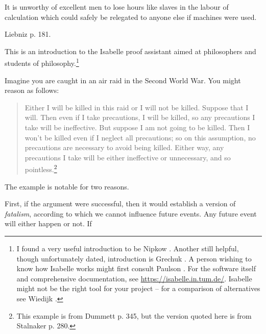 %
\begin{isabellebody}%
%
%
\isadelimtheory
%
\endisadelimtheory
%
\isatagtheory
%
\endisatagtheory
{\isafoldtheory}%
%
\isadelimtheory
%
\endisadelimtheory
%
\begin{isamarkuptext}%
\epigraph{It is unworthy of excellent men to lose hours like slaves in the labour of calculation which could 
safely be relegated to anyone else if machines were used.}{Liebniz \cite{smith_source_1959} p. 181.}%
\end{isamarkuptext}\isamarkuptrue%
%
\begin{isamarkuptext}%
This is an introduction to the Isabelle proof assistant aimed at philosophers and students
of philosophy.\footnote{I found a very useful introduction to be Nipkow \cite{nipkow_tutorial_2011}.
Another still helpful, though unfortunately dated, introduction is Grechuk \cite{grechuk_isabelle_2010}.
A person wishing to know how Isabelle works might first consult Paulson \cite{paulson_ml_1996}.
For the software itself and comprehensive documentation, see \url{https://isabelle.in.tum.de/}.
Isabelle might not be the right tool for your project -- for a comparison of alternatives see
Wiedijk \cite{wiedijk_seventeen_2006}.}%
\end{isamarkuptext}\isamarkuptrue%
%
\isamarkuptrue%
%
\begin{isamarkuptext}%
Imagine you are caught in an air raid in the Second World War. You might reason as follows:
\begin{quotation}
Either I will be killed in this raid or I will not be killed. Suppose that I will. Then even if I take
precautions, I will be killed, so any precautions I take will be ineffective. But suppose I am not
going to be killed. Then I won't be killed even if I neglect all precautions; so on this assumption,
no precautions are necessary to avoid being killed. Either way, any precautions I take will be either
ineffective or unnecessary, and so pointless.\footnote{This example is from Dummett \cite{dummett_bringing_1964} p. 345,
but the version quoted here is from Stalnaker \cite{stalnaker_indicative_1975} p. 280.}
\end{quotation} The example is notable for two reasons.%
\end{isamarkuptext}\isamarkuptrue%
%
\begin{isamarkuptext}%
First, if the argument were successful, then it would establish a version of \emph{fatalism},
according to which we cannot influence future events. Any future event will either happen or not. If

\end{isamarkuptext}
\end{isabellebody}
